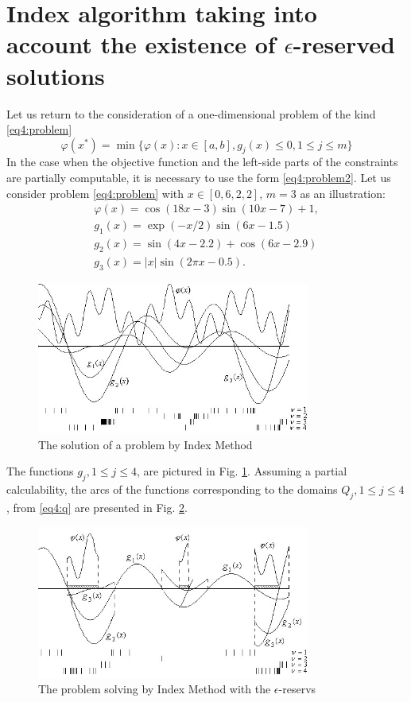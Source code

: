 \documentclass[graybox]{svmult}
\begin{document}
\section{Index algorithm taking into account the existence of $\epsilon$-reserved solutions}
Let us return to the consideration of a one-dimensional problem of the kind \eqref{eq4:problem}
\begin{displaymath}
  \varphi(x^*)=\min\{\varphi(x):x\in [a,b], g_j(x)\le 0,1\le j\le m\}
\end{displaymath}
In the case when the objective function and the left-side parts of the constraints are partially computable, it is necessary to use the form \eqref{eq4:problem2}.
\example
{
Let us consider problem \eqref{eq4:problem} with $x\in[0,6,2,2]$, $m=3$ as an illustration:
\begin{gather}
\varphi(x)=\cos(18x-3)\sin(10x-7)+1, \\
g_1(x)=\exp(-x/2)\sin(6x-1.5) \\
g_2(x)=\sin(4x-2.2)+\cos(6x-2.9) \\
g_3(x)=|x|\sin(2\pi x - 0.5).
\end{gather}
}
\begin{figure}[h]
  \label{fig:4_7}
  \centering
  \includegraphics[width=0.8\textwidth]{figures/4_7.jpg}
  \caption{The solution of a problem by Index Method}
\end{figure}
The functions $g_j , 1\le j\le 4$, are pictured in Fig. \ref{fig:4_7}. Assuming a partial calculability, the arcs of
the functions corresponding to the domains $Q_j ,1\le j\le 4$, from \eqref{eq4:q} are presented in Fig. \ref{fig:4_8}.

\begin{figure}[h]
  \label{fig:4_8}
  \centering
  \includegraphics[width=0.8\textwidth]{figures/4_8.jpg}
  \caption{The problem solving by Index Method with the $\epsilon$-reservs}
\end{figure}
\end{document}
